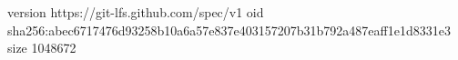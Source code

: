 version https://git-lfs.github.com/spec/v1
oid sha256:abec6717476d93258b10a6a57e837e403157207b31b792a487eaff1e1d8331e3
size 1048672
